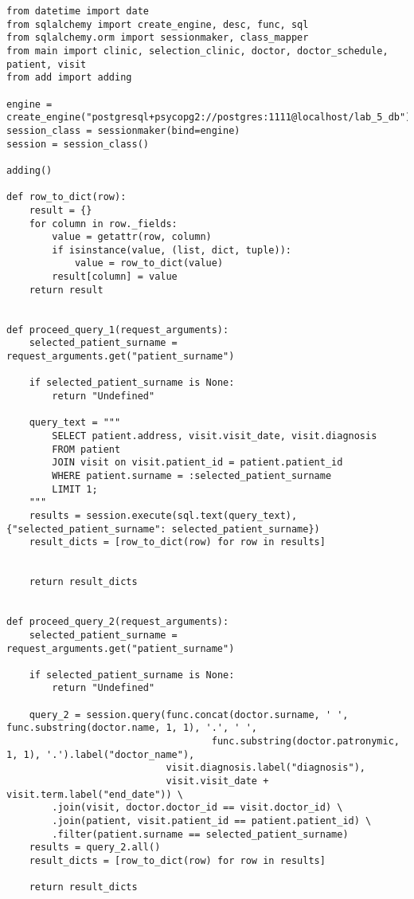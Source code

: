 \documentclass{article}
\begin{document}
{\normalsize
\begin{verbatim}
from datetime import date
from sqlalchemy import create_engine, desc, func, sql
from sqlalchemy.orm import sessionmaker, class_mapper
from main import clinic, selection_clinic, doctor, doctor_schedule, patient, visit  
from add import adding

engine = create_engine("postgresql+psycopg2://postgres:1111@localhost/lab_5_db")
session_class = sessionmaker(bind=engine)
session = session_class()

adding()

def row_to_dict(row):
    result = {}
    for column in row._fields:
        value = getattr(row, column)
        if isinstance(value, (list, dict, tuple)):
            value = row_to_dict(value)
        result[column] = value
    return result


def proceed_query_1(request_arguments):
    selected_patient_surname = request_arguments.get("patient_surname")

    if selected_patient_surname is None:
        return "Undefined"

    query_text = """
        SELECT patient.address, visit.visit_date, visit.diagnosis
        FROM patient
        JOIN visit on visit.patient_id = patient.patient_id
        WHERE patient.surname = :selected_patient_surname
        LIMIT 1;
    """
    results = session.execute(sql.text(query_text), {"selected_patient_surname": selected_patient_surname})
    result_dicts = [row_to_dict(row) for row in results]


    return result_dicts


def proceed_query_2(request_arguments):
    selected_patient_surname = request_arguments.get("patient_surname")

    if selected_patient_surname is None:
        return "Undefined"

    query_2 = session.query(func.concat(doctor.surname, ' ', func.substring(doctor.name, 1, 1), '.', ' ',
                                    func.substring(doctor.patronymic, 1, 1), '.').label("doctor_name"),
                            visit.diagnosis.label("diagnosis"),
                            visit.visit_date + visit.term.label("end_date")) \
        .join(visit, doctor.doctor_id == visit.doctor_id) \
        .join(patient, visit.patient_id == patient.patient_id) \
        .filter(patient.surname == selected_patient_surname)
    results = query_2.all()
    result_dicts = [row_to_dict(row) for row in results]

    return result_dicts


\end{verbatim}}
\end{document}
